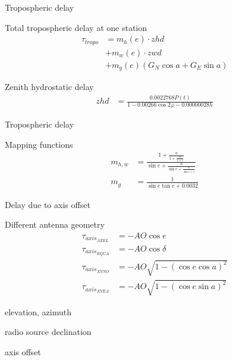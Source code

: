 \documentclass[14pt,table,t, c]{beamer}
\begin{document}
\begin{frame}{Tropospheric delay}
\begin{block}{Total tropospheric delay at one station}
\vspace*{-\baselineskip}\setlength\belowdisplayskip{0pt}\setlength\abovedisplayskip{0pt}
\begin{align*}
\tau_{tropo} &= m_h(e)\cdot zhd \\
             &+ m_w(e)\cdot zwd \\
             &+ m_g(e)(G_N\cos a + G_E\sin a)
\end{align*}
\end{block}

\begin{block}{Zenith hydrostatic delay}
\vspace*{-\baselineskip}\setlength\belowdisplayskip{0pt}\setlength\abovedisplayskip{0pt}
\begin{align*}
zhd &= \frac{0.0022768P(t)}{1 - 0.00266\cos 2\varphi - 0.00000028h} 
\end{align*}
\end{block}
\end{frame}

\begin{frame}{Tropospheric delay}
\begin{block}{Mapping functions}
\vspace*{-\baselineskip}\setlength\belowdisplayskip{0pt}\setlength\abovedisplayskip{0pt}
\begin{align*}
m_{h,w} &= \frac{1 + \frac{a}{1 + \frac{b}{1 + c}}}{\sin e + \frac{a}{\sin e + {\frac{b}{\sin e + c}}}} \\
m_g &= \frac{1}{\sin e \tan e + 0.0032}
\end{align*}
\end{block}
\end{frame}

\begin{frame}{Delay due to axis offset}

\begin{block}{Different antenna geometry}
\vspace*{-\baselineskip}\setlength\belowdisplayskip{0pt}\setlength\abovedisplayskip{0pt}
\begin{align*}
\tau_{axis_{AZEL}} &= -AO \cos e \\
\tau_{axis_{EQUA}} &= -AO \cos \delta \\
\tau_{axis_{XYNO}} &= -AO \sqrt{1 - (\cos e \cos a)^2} \\
\tau_{axis_{XYEA}} &= -AO \sqrt{1 - (\cos e \sin a)^2}
\end{align*}
\end{block}
\begin{description}[$e, a$]
\item[$e, a$] elevation, azimuth
\item[$\delta$] radio source declination
\item[$AO$] axis offset
\end{description}
\end{frame}
\end{document}

